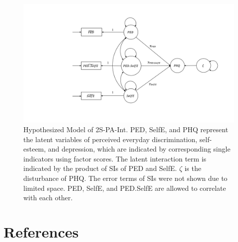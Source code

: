 \documentclass[
  man]{apa7}
\begin{document}
\begin{figure}

{\centering \includegraphics[width=1\linewidth]{Introduction/Plots/Slide3} 

}

\caption{Hypothesized Model of 2S-PA-Int. PED, SelfE, and PHQ represent the latent variables of perceived everyday discrimination, self-esteem, and depression, which are indicated by corresponding single indicators using factor scores. The latent interaction term is indicated by the product of SIs of PED and SelfE. $\zeta$ is the disturbance of PHQ. The error terms of SIs were not shown due to limited space. PED, SelfE, and PED.SelfE are allowed to correlate with each other.}\label{fig:figure-3}
\end{figure}

\newpage

\hypertarget{references}{%
\section{References}\label{references}}
\end{document}

